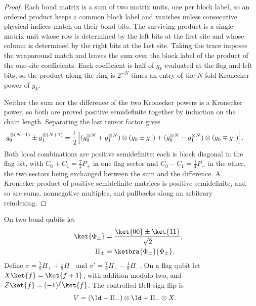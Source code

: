 \begin{proof}\leanok
    Each bond matrix is a sum of two matrix units, one per block label,
    so an ordered product keeps a common block label and vanishes unless
    consecutive physical indices match on their bond bits. The surviving
    product is a single matrix unit whose row is determined by the left
    bits at the first site and whose column is determined by the right
    bits at the last site. Taking the trace imposes the wraparound match
    and leaves the sum over the block label of the product of the one-site
    coefficients. Each coefficient is half of $g_k$ evaluated at the flag
    and left bits, so the product along the ring is $2^{-N}$ times an entry
    of the $N$-fold Kronecker power of $g_k$.

    Neither the sum nor the difference of the two Kronecker powers is a
    Kronecker power, so both are proved positive semidefinite together by
    induction on the chain length. Separating the last tensor factor gives
    \begin{align}
        g_0^{\otimes(N+1)}\pm g_1^{\otimes(N+1)}
         & =\frac12\Bigl[
            (g_0^{\otimes N}+g_1^{\otimes N})\otimes(g_0\pm g_1)
            +(g_0^{\otimes N}-g_1^{\otimes N})\otimes(g_0\mp g_1)
            \Bigr].
        \notag
    \end{align}
    Both local combinations are positive semidefinite: each is block
    diagonal in the flag bit, with $C_0+C_1=\frac74P_+$ in one flag sector
    and $C_0-C_1=\frac14P_-$ in the other, the two sectors being exchanged
    between the sum and the difference. A Kronecker product of positive
    semidefinite matrices is positive semidefinite, and so are sums,
    nonnegative multiples, and pullbacks along an arbitrary reindexing.
\end{proof}

\begin{definition}%
    \label{def:mpdo_twisted_dimer_controlled_flip}
    \leanok
    On two bond qubits let
    \begin{align}
        \ket{\Phi_\pm} & =\frac{\ket{00}\pm\ket{11}}{\sqrt2},
        \notag                                                \\
        \Pi_\pm        & =\ketbra{\Phi_\pm}{\Phi_\pm}.
        \notag
    \end{align}
    Define $\sigma=\frac78\Pi_++\frac18\Pi_-$ and
    $\sigma'=\frac78\Pi_+-\frac18\Pi_-$.
    On a flag qubit let $X\ket{f}=\ket{f+1}$, with addition modulo two,
    and $Z\ket{f}=(-1)^f\ket{f}$. The controlled Bell-sign flip is
    \begin{align}
        V & =(\Id-\Pi_-)\otimes\Id+\Pi_-\otimes X.
        \notag
    \end{align}
\end{definition}

